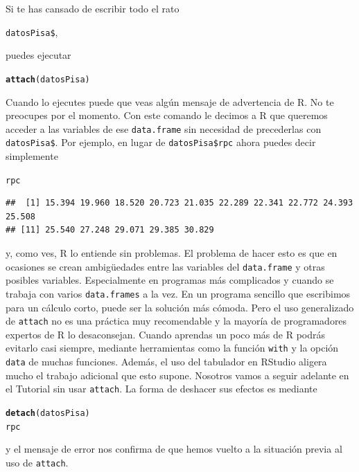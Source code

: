 \documentclass[10pt,a4paper]{article}\usepackage[]{graphicx}\usepackage[]{color}
\makeatletter
\newcommand{\hlstd}[1]{\textcolor[rgb]{0.345,0.345,0.345}{#1}}%
\newcommand{\hlkwd}[1]{\textcolor[rgb]{0.737,0.353,0.396}{\textbf{#1}}}%
\newenvironment{kframe}{%
 \def\at@end@of@kframe{}%
 \ifinner\ifhmode%
  \def\at@end@of@kframe{\end{minipage}}%
  \begin{minipage}{\columnwidth}%
 \fi\fi%
 \def\FrameCommand##1{\hskip\@totalleftmargin \hskip-\fboxsep
 \colorbox{shadecolor}{##1}\hskip-\fboxsep
     \hskip-\linewidth \hskip-\@totalleftmargin \hskip\columnwidth}%
 \MakeFramed {\advance\hsize-\width
   \@totalleftmargin\z@ \linewidth\hsize
   \@setminipage}}%
 {\par\unskip\endMakeFramed%
 \at@end@of@kframe}
\newenvironment{knitrout}{}{} %
\makeatother
\begin{document}
Si te has cansado de escribir todo el rato
\begin{center}
\verb#datosPisa$#,
\end{center}
puedes ejecutar
\begin{knitrout}
\color{fgcolor}\begin{kframe}
\begin{alltt}
  \hlkwd{attach}\hlstd{(datosPisa)}
\end{alltt}
\end{kframe}
\end{knitrout}
Cuando lo ejecutes puede que veas algún mensaje de advertencia de R. No te preocupes por el momento. Con este comando le decimos a R que queremos acceder a las variables de ese {\tt data.frame} sin necesidad de precederlas con \verb#datosPisa$#. Por ejemplo, en lugar de \verb#datosPisa$rpc# ahora puedes decir simplemente
\begin{knitrout}
\color{fgcolor}\begin{kframe}
\begin{alltt}
\hlstd{rpc}
\end{alltt}
\begin{verbatim}
##  [1] 15.394 19.960 18.520 20.723 21.035 22.289 22.341 22.772 24.393 25.508
## [11] 25.540 27.248 29.071 29.385 30.829
\end{verbatim}
\end{kframe}
\end{knitrout}
y, como ves, R lo entiende sin problemas. El problema de hacer esto es que en ocasiones se crean ambigüedades entre las variables del {\tt data.frame} y otras posibles variables. Especialmente en programas más complicados y cuando se trabaja con varios {\tt data.frames} a la vez. En un programa sencillo que escribimos para un cálculo corto, puede ser la solución más cómoda. Pero el uso generalizado de {\tt attach} no es una práctica muy recomendable y la mayoría de programadores expertos de R lo desaconsejan. Cuando aprendas un poco más de R podrás evitarlo casi siempre, mediante herramientas como la función {\tt with} y la opción {\tt data} de muchas funciones. Además, el uso del tabulador en RStudio aligera mucho el trabajo adicional que esto supone. Nosotros vamos a seguir adelante en el Tutorial sin usar {\tt attach}. La forma de deshacer sus efectos es mediante
\begin{knitrout}
\color{fgcolor}\begin{kframe}
\begin{alltt}
\hlkwd{detach}\hlstd{(datosPisa)}
\hlstd{rpc}
\end{alltt}


{\ttfamily\noindent\bfseries\color{errorcolor}{\#\# Error in eval(expr, envir, enclos): object 'rpc' not found}}\end{kframe}
\end{knitrout}
y el mensaje de error nos confirma de que hemos vuelto a la situación previa al uso de {\tt attach}.
\end{document}
